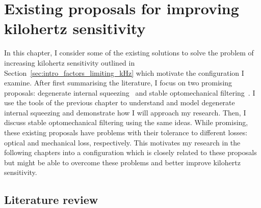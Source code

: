\chapter{Existing proposals for improving kilohertz sensitivity} %
\label{chp:proposals}

In this chapter, I consider some of the existing solutions to solve the problem of increasing kilohertz sensitivity outlined in Section~\ref{sec:intro_factors_limiting_kHz} which motivate the configuration I examine. After first summarising the literature, I focus on two promising proposals: degenerate internal squeezing~\cite{} and stable optomechanical filtering~\cite{}. I use the tools of the previous chapter to understand and model degenerate internal squeezing and demonstrate how I will approach my research. Then, I discuss stable optomechanical filtering using the same ideas. %
While promising, these existing proposals have problems with their tolerance to different losses: optical and mechanical loss, respectively. This motivates my research in the following chapters into a configuration which is closely related to these proposals but might be able to overcome these problems and better improve kilohertz sensitivity.


\section{Literature review}


